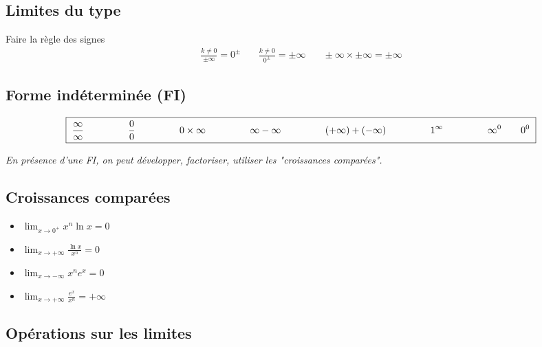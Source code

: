 \documentclass[12]{article}%
\theoremstyle{plain}
\theoremstyle{definition}
\theoremstyle{remark}
\begin{document}
\subsection{Limites du type}
Faire la règle des signes
\[
\boxed{
	\begin{array}{ccc}
		\displaystyle \frac{k \ne 0}{\pm\infty} = 0^\pm &
		\quad \displaystyle \frac{k \ne 0}{0^\pm} = \pm\infty &
		\quad \displaystyle \pm \infty \times \pm \infty = \pm \infty
	\end{array}
}
\]

\subsection{Forme indéterminée (FI)}

\[
\boxed{
	\begin{array}{@{\hskip 3pt} c @{\hskip 6pt} c @{\hskip 6pt} c @{\hskip 6pt} c @{\hskip 6pt} c @{\hskip 6pt} c @{\hskip 6pt} c @{\hskip 3pt}}
		\displaystyle \frac{\infty}{\infty}  \qquad \qquad &
		\displaystyle \frac{0}{0}  \qquad \qquad &
		\displaystyle 0 \times \infty \qquad \qquad &
		\displaystyle \infty - \infty \qquad \qquad &
		\displaystyle (+\infty) + (-\infty) \qquad \qquad &
		\displaystyle 1^\infty \qquad \qquad &
		\displaystyle \infty^0 \qquad 0^0
	\end{array}
}
\]


\textit{En présence d’une FI, on peut développer, factoriser, utiliser les "croissances comparées".}

\subsection{Croissances comparées}

\begin{itemize}
	\item \( \displaystyle \lim_{x \to 0^+} x^n \ln x = 0 \)
	\item \( \displaystyle \lim_{x \to +\infty} \frac{\ln x}{x^n} = 0 \)
	\item \( \displaystyle \lim_{x \to -\infty} x^n e^x = 0 \)
	\item \( \displaystyle \lim_{x \to +\infty} \frac{e^x}{x^n} = +\infty \)
\end{itemize}

\subsection{Opérations sur les limites}
\end{document}
